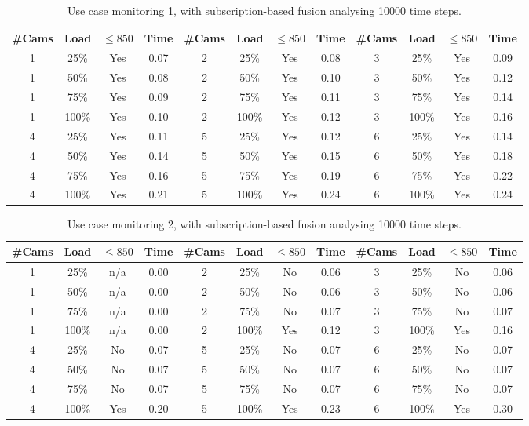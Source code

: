 \documentclass{article}
\begin{document}
\begin{table}
\centering
\begin{tabular}{|c|c|c|c|c|c|c|c|c|c|c|c|}
\hline
\#Cams & Load & $\leq 850$ & Time & \#Cams & Load & $\leq 850$ & Time & \#Cams & Load & $\leq 850$ & Time\\
\hline
1 & 25\% & Yes & 0.07 & 2 & 25\% & Yes & 0.08 & 3 & 25\% & Yes & 0.09\\
1 & 50\% & Yes & 0.08 & 2 & 50\% & Yes & 0.10 & 3 & 50\% & Yes & 0.12\\
1 & 75\% & Yes & 0.09 & 2 & 75\% & Yes & 0.11 & 3 & 75\% & Yes & 0.14\\
1 & 100\% & Yes & 0.10 & 2 & 100\% & Yes & 0.12 & 3 & 100\% & Yes & 0.16\\
\hline
4 & 25\% & Yes & 0.11 & 5 & 25\% & Yes & 0.12 & 6 & 25\% & Yes & 0.14\\
4 & 50\% & Yes & 0.14 & 5 & 50\% & Yes & 0.15 & 6 & 50\% & Yes & 0.18\\
4 & 75\% & Yes & 0.16 & 5 & 75\% & Yes & 0.19 & 6 & 75\% & Yes & 0.22\\
4 & 100\% & Yes & 0.21 & 5 & 100\% & Yes & 0.24 & 6 & 100\% & Yes & 0.24\\
\hline
\end{tabular}
\caption{Use case monitoring 1, with subscription-based fusion analysing 10000 time steps.}
\end{table}


\begin{table}
\centering
\begin{tabular}{|c|c|c|c|c|c|c|c|c|c|c|c|}
\hline
\#Cams & Load & $\leq 850$ & Time & \#Cams & Load & $\leq 850$ & Time & \#Cams & Load & $\leq 850$ & Time\\
\hline
1 & 25\% & n/a & 0.00 & 2 & 25\% & No & 0.06 & 3 & 25\% & No & 0.06\\
1 & 50\% & n/a & 0.00 & 2 & 50\% & No & 0.06 & 3 & 50\% & No & 0.06\\
1 & 75\% & n/a & 0.00 & 2 & 75\% & No & 0.07 & 3 & 75\% & No & 0.07\\
1 & 100\% & n/a & 0.00 & 2 & 100\% & Yes & 0.12 & 3 & 100\% & Yes & 0.16\\
\hline
4 & 25\% & No & 0.07 & 5 & 25\% & No & 0.07 & 6 & 25\% & No & 0.07\\
4 & 50\% & No & 0.07 & 5 & 50\% & No & 0.07 & 6 & 50\% & No & 0.07\\
4 & 75\% & No & 0.07 & 5 & 75\% & No & 0.07 & 6 & 75\% & No & 0.07\\
4 & 100\% & Yes & 0.20 & 5 & 100\% & Yes & 0.23 & 6 & 100\% & Yes & 0.30\\
\hline
\end{tabular}
\caption{Use case monitoring 2, with subscription-based fusion analysing 10000 time steps.}
\end{table}
\end{document}

